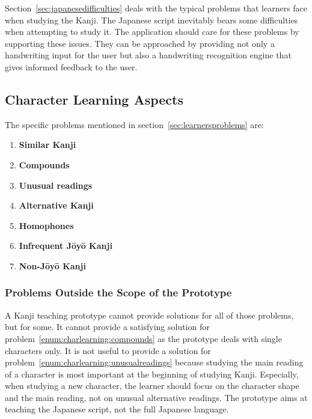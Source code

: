 Section~\ref{sec:japanesedifficulties} deals with the typical problems that 
learners face when studying the Kanji. The Japanese script inevitably bears some 
difficulties when attempting to study it. The application should care for these 
problems by supporting these issues. They can be approached by providing
not only a handwriting input for the user but also a handwriting recognition
engine that gives informed feedback to the user.

\subsection{Character Learning Aspects}
\label{sec:concept:charaterlearningaspects}

The specific problems mentioned in section~\ref{sec:learnersproblems} are:
\begin{enumerate}
  \item \textbf{Similar Kanji} \label{enum:charlearning:similarKanji}
  \item \textbf{Compounds} \label{enum:charlearning:compounds}
  \item \textbf{Unusual readings} \label{enum:charlearning:unusualreadings}
  \item \textbf{Alternative Kanji} \label{enum:charlearning:alternativeKanji}
  \item \textbf{Homophones} \label{enum:charlearning:homophones}
  \item \textbf{Infrequent Jōyō Kanji} \label{enum:charlearning:infrequenjoyo}
  \item \textbf{Non-Jōyō Kanji} \label{enum:charlearning:nonjoyo}
\end{enumerate}

\subsubsection{Problems Outside the Scope of the Prototype}
\label{sec:concept:problemsoutsidescope}

A Kanji teaching prototype cannot provide solutions for all of those problems,
but for some. It cannot provide a satisfying solution for 
problem~\ref{enum:charlearning:compounds} as the prototype deals with single
characters only. It is not useful to provide a solution for 
problem~\ref{enum:charlearning:unusualreadings} because studying the main
reading of a character is most important at the beginning of studying Kanji. 
Especially, when studying a new character, the learner should focus on the 
character shape and the main reading, not on unusual alternative readings. 
The prototype aims at teaching the Japanese script, not the full Japanese language.

